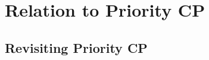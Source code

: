 % 

% 

% 

% 

% 



% 

% 

\section{Relation to Priority CP}
\begingroup
{}
\subsection{Revisiting Priority CP}
\label{app:revisiting-PCP}

